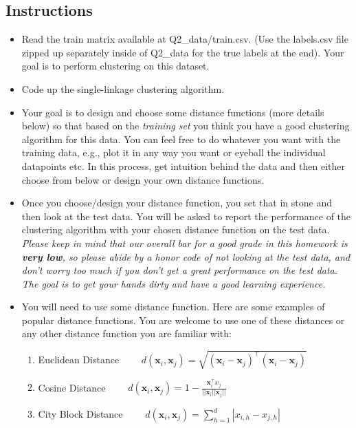 \documentclass{article}
\begin{document}
\subsection{Instructions}
\begin{itemize}

\item Read the train matrix available at Q2\_data/train.csv. (Use the labels.csv file zipped up separately inside of Q2\_data for the true labels at the end). Your goal is to perform clustering on this dataset.

\item Code up the single-linkage clustering algorithm.

\item Your goal is to design and choose some distance functions (more details below) so that based on the \emph{training set} you think you have a good clustering algorithm for this data. You can feel free to do whatever you want with the training data, e.g., plot it in any way you want or eyeball the individual datapoints etc. In this process, get intuition behind the data and then either choose from below or design your own distance functions.

\item Once you choose/design your distance function, you set that in stone and then look at the test data. You will be asked to report the performance of the clustering algorithm with your chosen distance function on the test data. \emph{Please keep in mind that our overall bar for a good grade in this homework is \textbf{very low}, so please abide by a honor code of not looking at the test data, and don't worry too much if you don't get a great performance on the test data. The goal is to get your hands dirty and have a good learning experience.} 

\item You will need to use some distance function. Here are some examples of popular distance functions. You are welcome to use one of these distances or any other distance function you are familiar with:
\begin{enumerate}
    \item Euclidean Distance $\qquad d(\mathbf{x}_{i}, \mathbf{x}_{j}) = \sqrt{(\mathbf{x}_{i}-\mathbf{x}_{j})^{\intercal}(\mathbf{x}_{i}-\mathbf{x}_{j})}$
    \item Cosine Distance $\qquad d(\mathbf{x}_{i}, \mathbf{x}_{j}) = 1-\frac{\mathbf{x}_{i}^{\intercal}x_{j}}{||\mathbf{x}_{i}||\mathbf{x}_{j}||}$
    \item City Block Distance $\qquad d(\mathbf{x}_{i}, \mathbf{x}_{j})=\sum^{d}_{h=1}|x_{i,h}-x_{j,h}|$
\end{enumerate}


\end{itemize}
\end{document}
